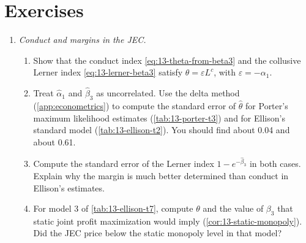 \section{Exercises}\label{sec:13-exercises}

\begin{enumerate}[label=\arabic*., leftmargin=*, itemsep=6pt]

\item \textit{Conduct and margins in the JEC.}
\begin{enumerate}[label=(\alph*)]
  \item Show that the conduct index \eqref{eq:13-theta-from-beta3} and the collusive Lerner index
  \eqref{eq:13-lerner-beta3} satisfy $\theta = \varepsilon L^{c}$, with $\varepsilon = -\alpha_1$.
  \item Treat $\hat\alpha_1$ and $\hat\beta_3$ as uncorrelated. Use the delta method (\cref{app:econometrics}) to
  compute the standard error of $\hat\theta$ for Porter's maximum likelihood estimates (\cref{tab:13-porter-t3})
  and for Ellison's standard model (\cref{tab:13-ellison-t2}). You should find about 0.04 and about 0.61.
  \item Compute the standard error of the Lerner index $1 - e^{-\hat\beta_3}$ in both cases. Explain why the
  margin is much better determined than conduct in Ellison's estimates.
  \item For model 3 of \cref{tab:13-ellison-t7}, compute $\theta$ and the value of $\beta_3$ that static joint
  profit maximization would imply (\cref{cor:13-static-monopoly}). Did the JEC price below the static monopoly level
  in that model?
\end{enumerate}


\end{enumerate}
